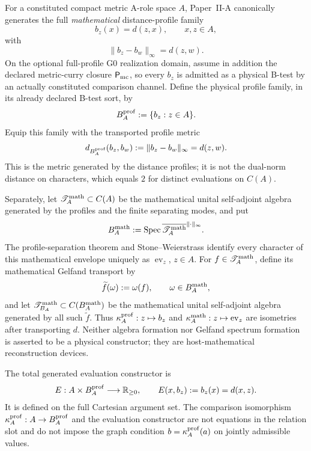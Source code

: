 \documentclass[11pt,a4paper]{article}
\begin{document}
\begin{definition}
\label{p3:def:reciprocal-interface-hypotheses}
For a constituted compact metric A-role space \(A\), Paper~II-A canonically
generates the full \emph{mathematical} distance-profile family
\[
       b_z(x)=d(z,x),\qquad x,z\in A,
\]
with
\[
       \lVert b_z-b_w\rVert_\infty=d(z,w).
\]
On the optional full-profile G0 realization domain, assume in addition the
declared metric-curry closure \(\mathsf P_{\rm mc}\), so every \(b_z\) is
admitted as a physical B-test by an actually constituted comparison channel.
Define the physical profile family, in its already declared B-test sort, by
\[
       B_A^{\rm prof}:=\{b_z:z\in A\}.
\]
Equip this family with the transported profile metric
\begin{equation}
\label{p3a:eq:profile-spectrum-metric}
 d_{B_A^{\rm prof}}(b_z,b_w)
 :=\lVert b_z-b_w\rVert_\infty
 =d(z,w).
\end{equation}
This is the metric generated by the distance profiles; it is not the dual-norm
distance on characters, which equals \(2\) for distinct evaluations on
\(C(A)\).

Separately, let \(\mathscr T_A^{\rm math}\subset C(A)\) be the mathematical
unital self-adjoint algebra generated by the profiles and the finite separating
modes, and put
\[
 B_A^{\rm math}:=
 \operatorname{Spec}
 \overline{\mathscr T_A^{\rm math}}^{\lVert\cdot\rVert_\infty}.
\]
The profile-separation theorem and Stone--Weierstrass identify every character
of this mathematical envelope uniquely as \(\operatorname{ev}_z\), \(z\in A\).
For \(f\in\mathscr T_A^{\rm math}\), define its mathematical
Gelfand transport by
\[
       \widetilde f(\omega):=\omega(f),
       \qquad \omega\in B_A^{\rm math},
\]
and let \(\mathscr T_{B_A}^{\rm math}\subset C(B_A^{\rm math})\) be the
mathematical unital self-adjoint algebra
generated by all such \(\widetilde f\).  Thus
\(\kappa_A^{\rm prof}:z\mapsto b_z\) and
\(\kappa_A^{\rm math}:z\mapsto\operatorname{ev}_z\) are isometries after
transporting \(d\).  Neither algebra formation nor Gelfand spectrum formation
is asserted to be a physical constructor; they are host-mathematical
reconstruction devices.

The total generated evaluation constructor is
\[
       E:A\times B_A^{\rm prof}\longrightarrow\mathbb R_{\ge0},
       \qquad
       E(x,b_z):=b_z(x)=d(x,z).
\]
It is defined on the full Cartesian argument set.  The comparison isomorphism
\(\kappa_A^{\rm prof}:A\to B_A^{\rm prof}\) and the evaluation constructor
are not equations in the
relation slot and do not impose the graph condition
\(b=\kappa_A^{\rm prof}(a)\) on jointly admissible values.


\end{definition}
\end{document}
